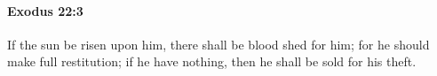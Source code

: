 
		\paragraph{Exodus 22:3} %
			\label{EXODUS-22-3}

			If the sun be risen upon him, there shall be blood shed for him; for he should make full restitution; if he have nothing, then he shall be sold for his theft.


